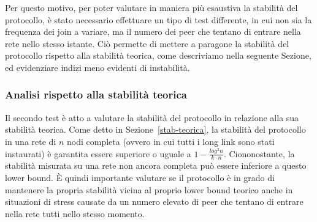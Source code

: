 \documentclass[prodmode,acmtap]{acmlarge}
\begin{document}
Per questo motivo, per poter valutare in maniera più esaustiva la stabilità del protocollo, è stato necessario effettuare un tipo di test differente, in cui non sia la frequenza dei join a variare, ma il numero dei peer che tentano di entrare nella rete nello stesso istante. Ciò permette di mettere a paragone la stabilità del protocollo rispetto alla stabilità teorica, come descriviamo nella seguente Sezione, ed evidenziare indizi meno evidenti di instabilità.



\subsubsection{Analisi rispetto alla stabilità teorica}
Il secondo test è atto a valutare la stabilità del protocollo in relazione alla sua stabilità teorica. Come detto in Sezione~\ref{stab-teorica}, la stabilità del protocollo in una rete di $n$ nodi completa (ovvero in cui tutti i long link sono stati instaurati) è garantita essere superiore o uguale a $1 - \frac{log^2n}{k \cdot n}$. Ciononostante, la stabilità misurata su una rete non ancora completa può essere inferiore a questo lower bound. È quindi importante valutare se il protocollo è in grado di mantenere la propria stabilità vicina al proprio lower bound teorico anche in situazioni di stress causate da un numero elevato di peer che tentano di entrare nella rete tutti nello stesso momento.
\end{document}
